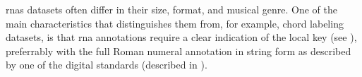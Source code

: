 
\glspl{rna} datasets often  differ in their size, format,
and musical genre. One of the main characteristics that
distinguishes them from, for example, chord labeling
datasets, is that \gls{rna} annotations require a clear
indication of the local key (see ),
preferrably with the full Roman numeral annotation in string
form as described by one of the digital standards (described in
).